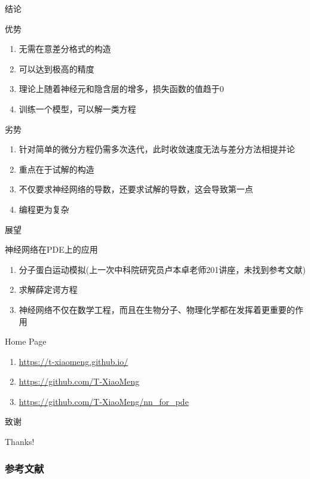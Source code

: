 \documentclass[hyperref,UTF8,11pt]{beamer}
\begin{document}
\begin{frame}{结论}
    \begin{exampleblock}{优势}
		\begin{enumerate}
			\item 无需在意差分格式的构造
			\item 可以达到极高的精度
			\item 理论上随着神经元和隐含层的增多，损失函数的值趋于$0$
			\item 训练一个模型，可以解一类方程\cite{DBLP}
		\end{enumerate}
	\end{exampleblock}
	
	\begin{alertblock}{劣势}
		\begin{enumerate}
			\item 针对简单的微分方程仍需多次迭代，此时收敛速度无法与差分方法相提并论
			\item 重点在于试解的构造
			\item 不仅要求神经网络的导数，还要求试解的导数，这会导致第一点
			\item 编程更为复杂
		\end{enumerate}
	\end{alertblock}
\end{frame}
\begin{frame}{展望}
    \begin{block}{神经网络在PDE上的应用}
		\begin{enumerate}
			\item 分子蛋白运动模拟(上一次中科院研究员卢本卓老师201讲座，未找到参考文献)
			\item 求解薛定谔方程\cite{solve_mxde, SolvingXDE}
			\item 神经网络不仅在数学工程，而且在生物分子、物理化学都在发挥着更重要的作用
		\end{enumerate}
	\end{block}
\end{frame}


\begin{frame}{Home Page}

\begin{enumerate}
	\item \url{https://t-xiaomeng.github.io/}
	\item \url{https://github.com/T-XiaoMeng}
	\item \url{https://github.com/T-XiaoMeng/nn_for_pde}
\end{enumerate}

\end{frame}
\begin{frame}{致谢}
\begin{center}
	{\Huge\calligra Thanks!}
\end{center}
\end{frame}


\begin{frame}[allowframebreaks]
    \frametitle{参考文献}
    \printbibliography
\end{frame}
\end{document}
